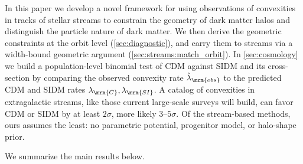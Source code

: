 \documentclass[linenumbers,twocolumn]{aastex701}
\newcommand{\lamC}{\ensuremath{\lambda_{\mrm{C}}}}    %
\newcommand{\lamSI}{\ensuremath{\lambda_{\mrm{SI}}}}  %
\newcommand{\lamObs}{\ensuremath{\hat{\lambda}_{\mrm{obs}}}}  %
\begin{document}
    In this paper we develop a novel framework for using observations of convexities in tracks of stellar streams to constrain the geometry of dark matter halos and distinguish the particle nature of dark matter. %
    We then derive the geometric constraints at the orbit level (\autoref{sec:diagnostic}), and carry them to streams via a width-bound geometric argument (\autoref{sec:streams:match_orbit}). %
    In \autoref{sec:cosmology} we build a population-level binomial test of \gls{CDM} against \gls{SIDM} and its cross-section by comparing the observed convexity rate $\lamObs$ to the predicted \gls{CDM} and \gls{SIDM} rates $\lamC, \lamSI$. %
    A catalog of convexities in extragalactic streams, like those current large-scale surveys will build, can favor \gls{CDM} or \gls{SIDM} by at least $2\sigma$, more likely $3$--$5\sigma$. %
    Of the stream-based methods, ours assumes the least: no parametric potential, progenitor model, or halo-shape prior. %

    We summarize the main results below. %
\end{document}
